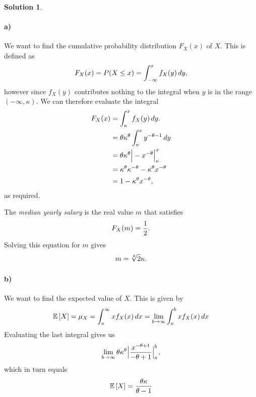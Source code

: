 \documentclass[a4paper, fleqn]{amsart}
\theoremstyle{definition}
\newtheorem{sltn}{Solution}
\begin{document}
\begin{sltn}
\item\paragraph{a)}
  We want to find the cumulative probability distribution $F_X(x)$ of $X$.
  This is defined as
  \begin{equation}
    \notag
    F_X(x) = P(X \leq x) = \int_{-\infty}^{x}f_X(y) \, dy, 
  \end{equation}
  however since $f_X(y)$ contributes nothing to the integral when $y$ is in the
  range $(-\infty, \kappa)$.  We can therefore evaluate the integral
  \begin{align*}
    \notag
    F_X(x) &= \int_{\kappa}^{x}f_X(y) \, dy.\\
    &= \theta\kappa^{\theta}\int_{\kappa}^{x}y^{-\theta-1} \, dy  \\
    &= \theta\kappa^{\theta} \Big\lvert -x^{-\theta} \Big\rvert_{\kappa}^{x}\\
    &= \kappa^{\theta}\kappa^{-\theta} - \kappa^{\theta}x^{-\theta} \\
    &= 1 - \kappa^{\theta}x^{-\theta}, 
  \end{align*}
  as required.

  The \textit{median yearly salary} is the real value $m$ that satisfies
  \begin{equation}
    \notag
    F_{X}(m) = \frac{1}{2}.
  \end{equation}
  Solving this equation for $m$ gives
  \begin{equation}
    \notag
    m = \sqrt[\theta]{2}\kappa.
  \end{equation}

\paragraph{b)}
We want to find the expected value of $X$. This is given by
\begin{equation}
  \notag
  \mathbb{E}\left[ X \right] = \mu_{X} = \int_{\kappa}^{\infty} xf_X(x)\, dx= \lim\limits_{b\rightarrow\infty}\int_{\kappa}^{b}xf_X(x)\, dx
\end{equation}
Evaluating the last integral gives us
\begin{equation}
  \notag
  \lim_{b\rightarrow\infty}\theta\kappa^{\theta}\Big\lvert \frac{x^{-\theta + 1}}{-\theta + 1}\Big\rvert_{\kappa}^{b},
\end{equation}
which in turn equals
\begin{equation}
  \notag
  \mathbb{E}\left[ X \right]= \frac{\theta\kappa}{\theta-1}
\end{equation}


\end{sltn}
\end{document}
